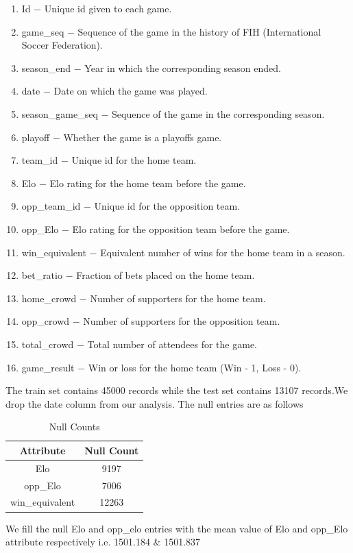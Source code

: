 \documentclass[a4paper, 12pt]{article}
\begin{document}
\begin{enumerate}
    \item Id $-$ Unique id given to each game.
    \item game\_seq $-$ Sequence of the game in the history of FIH (International Soccer Federation).
    \item season\_end $-$ Year in which the corresponding season ended.

    \item date $-$ Date on which the game was played.

    \item season\_game\_seq $-$ Sequence of the game in the corresponding season.
    \item playoff $-$ Whether the game is a playoffs game.

    \item team\_id $-$ Unique id for the home team.

    \item Elo $-$ Elo rating for the home team before the game.

    \item opp\_team\_id $-$ Unique id for the opposition team.

    \item opp\_Elo $-$ Elo rating for the opposition team before the game.

    \item win\_equivalent $-$ Equivalent number of wins for the home team in a season.

    \item bet\_ratio $-$ Fraction of bets placed on the home team.
    \item home\_crowd $-$ Number of supporters for the home team.
    \item opp\_crowd $-$ Number of supporters for the opposition team.
    \item total\_crowd $-$ Total number of attendees for the game.
    \item game\_result $-$ Win or loss for the home team (Win - 1, Loss - 0).
\end{enumerate}

The train set contains 45000 records while the test set contains 13107 records.We drop the date column from our analysis. 
The null entries are as follows
\begin{table}[h]
    \centering
    \begin{tabular}{|c|c|}
    \hline
    Attribute & Null Count\\
    \hline
    Elo & 9197\\
    \hline
    opp\_Elo & 7006\\
    \hline
    win\_equivalent & 12263\\
    \hline
    \end{tabular}
    \caption{Null Counts}
    \label{tab:my_label}
\end{table}
\par We fill the null Elo and opp\_elo entries with the mean value of Elo and opp\_Elo attribute respectively i.e. 1501.184 & 1501.837
\end{document}
